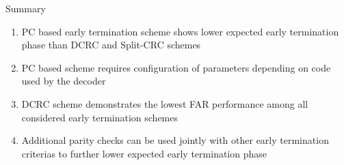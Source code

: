 \begin{frame}{Summary}
  \begin{enumerate}
  \item PC based early termination scheme shows lower expected early termination phase than DCRC and Split-CRC schemes
  \item PC based scheme requires configuration of parameters depending on code used by the decoder
  \item DCRC scheme demonstrates the lowest FAR performance among all considered early termination schemes
  \item Additional parity checks can be used jointly with other early termination criterias to further lower expected early termination phase
  \end{enumerate}
\end{frame}

 
